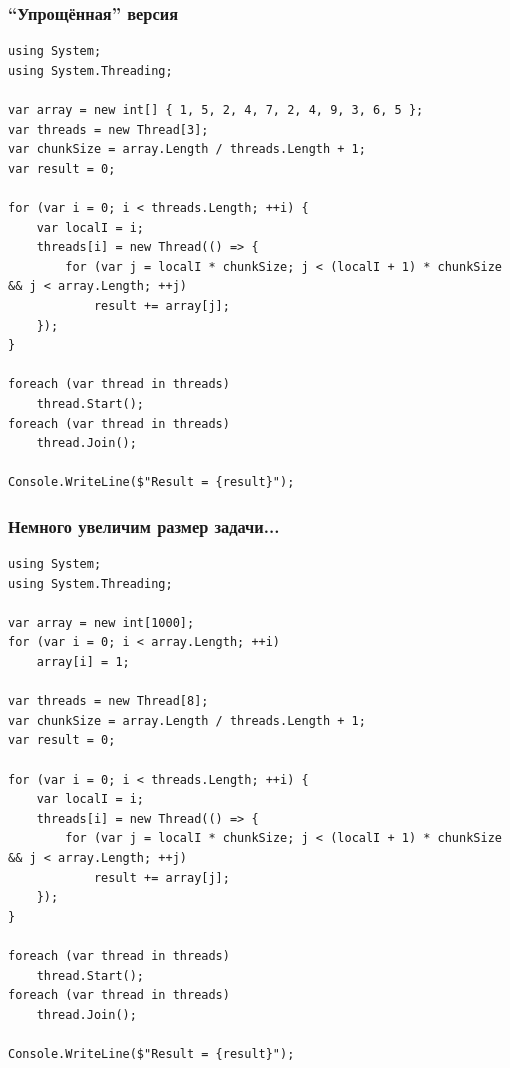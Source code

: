 \documentclass{../../slides-style}
\begin{document}
    \begin{frame}[fragile]
        \frametitle{``Упрощённая'' версия}
        \begin{ssmall}
            \begin{verbatim}
using System;
using System.Threading;

var array = new int[] { 1, 5, 2, 4, 7, 2, 4, 9, 3, 6, 5 };
var threads = new Thread[3];
var chunkSize = array.Length / threads.Length + 1;
var result = 0;

for (var i = 0; i < threads.Length; ++i) {
    var localI = i;
    threads[i] = new Thread(() => {
        for (var j = localI * chunkSize; j < (localI + 1) * chunkSize && j < array.Length; ++j)
            result += array[j];
    });
}

foreach (var thread in threads)
    thread.Start();
foreach (var thread in threads)
    thread.Join();

Console.WriteLine($"Result = {result}");
            \end{verbatim}
        \end{ssmall}
    \end{frame}

    \begin{frame}[fragile]
        \frametitle{Немного увеличим размер задачи...}
        \begin{ssmall}
            \begin{verbatim}
using System;
using System.Threading;

var array = new int[1000];
for (var i = 0; i < array.Length; ++i)
    array[i] = 1;

var threads = new Thread[8];
var chunkSize = array.Length / threads.Length + 1;
var result = 0;

for (var i = 0; i < threads.Length; ++i) {
    var localI = i;
    threads[i] = new Thread(() => {
        for (var j = localI * chunkSize; j < (localI + 1) * chunkSize && j < array.Length; ++j)
            result += array[j];
    });
}

foreach (var thread in threads)
    thread.Start();
foreach (var thread in threads)
    thread.Join();

Console.WriteLine($"Result = {result}");
            \end{verbatim}
        \end{ssmall}
    \end{frame}
\end{document}
